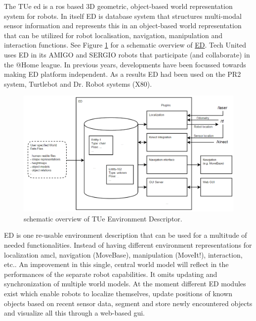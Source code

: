 The TUe \acrfull{ed} is a \acrfull{ros} based 3D geometric, object-based world representation system for robots. In itself ED is database system that structures multi-modal sensor information and represents this in an object-based world representation that can be utilized for robot localisation, navigation, manipulation and interaction functions. See Figure \ref{fig:ed} for a schematic overview of \href{https://github.com/tue-robotics/ed}{ED}. %
Tech United uses ED in its AMIGO and SERGIO robots that participate (and collaborate) in the @Home league. In previous years, developments have been focussed towards making ED platform independent. As a results ED had been used on the PR2 system, Turtlebot and Dr. Robot systems (X80).
\begin{figure}[h]
    \vspace{-0.3cm}
	\includegraphics[width = \linewidth]{Figures/ed_overview}
    \vspace{-1em}
	\caption{schematic overview of TUe Environment Descriptor.}
	\label{fig:ed}
    \vspace{-0.5cm}
\end{figure}
ED is one re-usable environment description that can be used for a multitude of needed functionalities. Instead of having different environment representations for localization \acrfull{amcl}, navigation (MoveBase), manipulation (MoveIt!), interaction, etc.. An improvement in this single, central world model will reflect in the performances of the separate robot capabilities. It omits updating and synchronization of multiple world models. At the moment different ED modules exist which enable robots to localize themselves, update positions of known objects based on recent sensor data, segment and store newly encountered objects and visualize all this through a web-based \acrshort{gui}.

